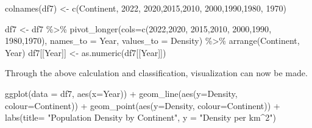 \documentclass[
]{article}
\newenvironment{Shaded}{\begin{snugshade}}{\end{snugshade}}
\newcommand{\AttributeTok}[1]{\textcolor[rgb]{0.77,0.63,0.00}{#1}}
\newcommand{\FunctionTok}[1]{\textcolor[rgb]{0.00,0.00,0.00}{#1}}
\newcommand{\NormalTok}[1]{#1}
\newcommand{\OtherTok}[1]{\textcolor[rgb]{0.56,0.35,0.01}{#1}}
\newcommand{\SpecialCharTok}[1]{\textcolor[rgb]{0.00,0.00,0.00}{#1}}
\newcommand{\StringTok}[1]{\textcolor[rgb]{0.31,0.60,0.02}{#1}}
\begin{document}
\begin{Shaded}
\begin{Highlighting}[]
\FunctionTok{colnames}\NormalTok{(df7) }\OtherTok{\textless{}{-}} \FunctionTok{c}\NormalTok{(}\StringTok{\textquotesingle{}Continent\textquotesingle{}}\NormalTok{, }\StringTok{\textquotesingle{}2022\textquotesingle{}}\NormalTok{,}
                  \StringTok{\textquotesingle{}2020\textquotesingle{}}\NormalTok{,}\StringTok{\textquotesingle{}2015\textquotesingle{}}\NormalTok{,}\StringTok{\textquotesingle{}2010\textquotesingle{}}\NormalTok{,}
                  \StringTok{\textquotesingle{}2000\textquotesingle{}}\NormalTok{,}\StringTok{\textquotesingle{}1990\textquotesingle{}}\NormalTok{,}\StringTok{\textquotesingle{}1980\textquotesingle{}}\NormalTok{,}
                  \StringTok{\textquotesingle{}1970\textquotesingle{}}\NormalTok{)}

\NormalTok{df7 }\OtherTok{\textless{}{-}}\NormalTok{ df7 }\SpecialCharTok{\%\textgreater{}\%} \FunctionTok{pivot\_longer}\NormalTok{(}\AttributeTok{cols=}\FunctionTok{c}\NormalTok{(}\StringTok{\textquotesingle{}2022\textquotesingle{}}\NormalTok{,}\StringTok{\textquotesingle{}2020\textquotesingle{}}\NormalTok{,}
                       \StringTok{\textquotesingle{}2015\textquotesingle{}}\NormalTok{,}\StringTok{\textquotesingle{}2010\textquotesingle{}}\NormalTok{,}
                      \StringTok{\textquotesingle{}2000\textquotesingle{}}\NormalTok{,}\StringTok{\textquotesingle{}1990\textquotesingle{}}\NormalTok{,}
                      \StringTok{\textquotesingle{}1980\textquotesingle{}}\NormalTok{,}\StringTok{\textquotesingle{}1970\textquotesingle{}}\NormalTok{),}
                      \AttributeTok{names\_to =} \StringTok{\textquotesingle{}Year\textquotesingle{}}\NormalTok{, }\AttributeTok{values\_to =} \StringTok{\textquotesingle{}Density\textquotesingle{}}\NormalTok{) }\SpecialCharTok{\%\textgreater{}\%}
  \FunctionTok{arrange}\NormalTok{(Continent, Year)}
\NormalTok{df7[[}\StringTok{\textquotesingle{}Year\textquotesingle{}}\NormalTok{]] }\OtherTok{\textless{}{-}} \FunctionTok{as.numeric}\NormalTok{(df7[[}\StringTok{\textquotesingle{}Year\textquotesingle{}}\NormalTok{]])}
\end{Highlighting}
\end{Shaded}

Through the above calculation and classification, visualization can now
be made.

\begin{Shaded}
\begin{Highlighting}[]
\FunctionTok{ggplot}\NormalTok{(}\AttributeTok{data =}\NormalTok{ df7, }\FunctionTok{aes}\NormalTok{(}\AttributeTok{x=}\NormalTok{Year)) }\SpecialCharTok{+} 
  \FunctionTok{geom\_line}\NormalTok{(}\FunctionTok{aes}\NormalTok{(}\AttributeTok{y=}\NormalTok{Density, }\AttributeTok{colour=}\NormalTok{Continent)) }\SpecialCharTok{+} 
  \FunctionTok{geom\_point}\NormalTok{(}\FunctionTok{aes}\NormalTok{(}\AttributeTok{y=}\NormalTok{Density, }\AttributeTok{colour=}\NormalTok{Continent)) }\SpecialCharTok{+}
  \FunctionTok{labs}\NormalTok{(}\AttributeTok{title=} \StringTok{"Population Density by Continent"}\NormalTok{, }\AttributeTok{y =} \StringTok{"Density per km\^{}2"}\NormalTok{)}
\end{Highlighting}
\end{Shaded}
\end{document}
